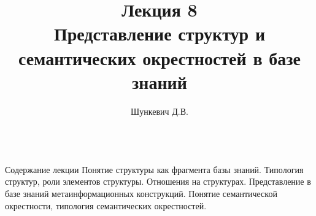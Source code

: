 \title{Лекция 8\\Представление структур и семантических окрестностей в базе знаний}   
\author[]{Шункевич Д.В.}

\begin{frame}
	\titlepage
\end{frame}

\begin{frame}{\\Содержание лекции}
	\topline
	\justifying
	Понятие структуры как фрагмента базы знаний. Типология структур, роли элементов структуры. Отношения на структурах. Представление в базе знаний метаинформационных конструкций. Понятие семантической окрестности, типология семантических окрестностей.
\end{frame}
